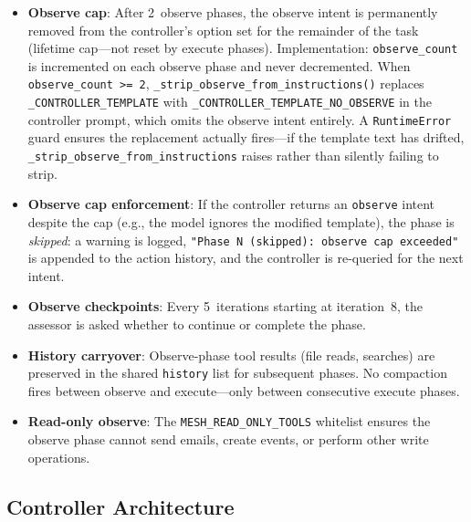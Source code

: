 \documentclass[11pt,a4paper]{article}
\newcommand{\code}[1]{\texttt{#1}}
\begin{document}
\begin{itemize}[nosep]
  \item \textbf{Observe cap}: After 2~observe phases, the observe
        intent is permanently removed from the controller's option set
        for the remainder of the task (lifetime cap---not reset by
        execute phases). Implementation: \code{observe\_count} is
        incremented on each observe phase and never decremented.
        When \code{observe\_count >= 2},
        \code{\_strip\_observe\_from\_instructions()} replaces
        \code{\_CONTROLLER\_TEMPLATE} with
        \code{\_CONTROLLER\_TEMPLATE\_NO\_OBSERVE} in the controller
        prompt, which omits the observe intent entirely. A
        \code{RuntimeError} guard ensures the replacement actually
        fires---if the template text has drifted,
        \code{\_strip\_observe\_from\_instructions} raises rather than
        silently failing to strip.
  \item \textbf{Observe cap enforcement}: If the controller returns an
        \code{observe} intent despite the cap (e.g., the model ignores
        the modified template), the phase is \emph{skipped}: a warning
        is logged, \code{"Phase N (skipped): observe cap exceeded"} is
        appended to the action history, and the controller is
        re-queried for the next intent.
  \item \textbf{Observe checkpoints}: Every 5~iterations starting at
        iteration~8, the assessor is asked whether to continue or
        complete the phase.
  \item \textbf{History carryover}: Observe-phase tool results
        (file reads, searches) are preserved in the shared
        \code{history} list for subsequent phases. No compaction fires
        between observe and execute---only between consecutive execute
        phases.
  \item \textbf{Read-only observe}: The \code{MESH\_READ\_ONLY\_TOOLS}
        whitelist ensures the observe phase cannot send emails, create
        events, or perform other write operations.
\end{itemize}

\subsection{Controller Architecture}
\end{document}
